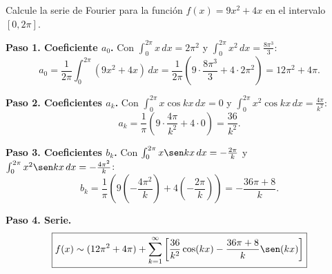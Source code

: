 \begin{prob}
Calcule la serie de Fourier para la función $f(x)=9x^2+4x$ en el intervalo $\left[0,2\pi\right].$
\begin{myproof}
\textbf{Paso 1. Coeficiente $a_0$.} Con $\int_0^{2\pi} x\,dx = 2\pi^2$ y $\int_0^{2\pi} x^2\,dx = \frac{8\pi^3}{3}$:
\[
a_0 = \frac{1}{2\pi}\int_0^{2\pi} (9x^2+4x)\,dx = \frac{1}{2\pi}\left(9\cdot\frac{8\pi^3}{3} + 4\cdot 2\pi^2\right) = 12\pi^2 + 4\pi.
\]

\textbf{Paso 2. Coeficientes $a_k$.} Con $\int_0^{2\pi} x\cos kx\,dx = 0$ y $\int_0^{2\pi} x^2\cos kx\,dx = \frac{4\pi}{k^2}$:
\[
a_k = \frac{1}{\pi}\left(9\cdot\frac{4\pi}{k^2} + 4\cdot 0\right) = \frac{36}{k^2}.
\]

\textbf{Paso 3. Coeficientes $b_k$.} Con $\int_0^{2\pi} x\sen kx\,dx = -\frac{2\pi}{k}$ y $\int_0^{2\pi} x^2\sen kx\,dx = -\frac{4\pi^2}{k}$:
\[
b_k = \frac{1}{\pi}\left(9\left(-\frac{4\pi^2}{k}\right) + 4\left(-\frac{2\pi}{k}\right)\right) = -\frac{36\pi + 8}{k}.
\]

\textbf{Paso 4. Serie.}
\[
\boxed{f(x) \sim (12\pi^2 + 4\pi) + \sum_{k=1}^{\infty} \left[ \frac{36}{k^2} \cos(kx) - \frac{36\pi + 8}{k} \sen(kx) \right]}
\]
\end{myproof}
\end{prob}

